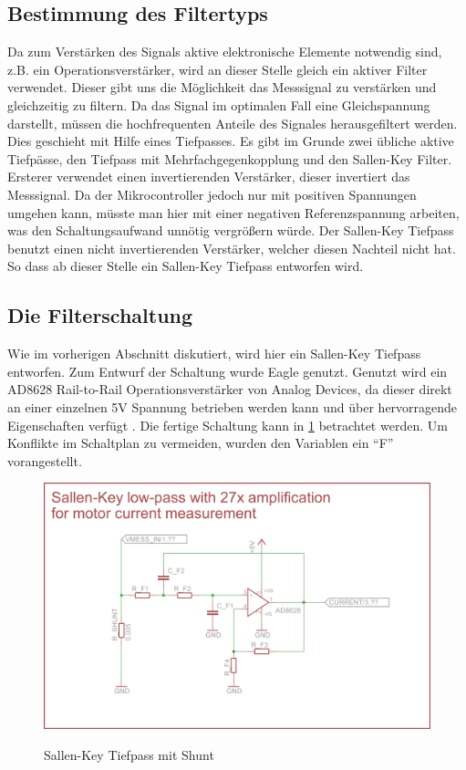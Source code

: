 \subsection{Bestimmung des Filtertyps}
Da zum Verstärken des Signals aktive elektronische Elemente notwendig sind, z.B. ein Operationsverstärker, wird an dieser Stelle gleich ein aktiver Filter verwendet. 
Dieser gibt uns die Möglichkeit das Messsignal zu verstärken und gleichzeitig zu
filtern. Da das Signal im optimalen Fall eine Gleichspannung darstellt, müssen die hochfrequenten Anteile des Signales herausgefiltert werden. Dies geschieht 
mit Hilfe eines Tiefpasses. Es gibt im Grunde zwei übliche aktive Tiefpässe, den Tiefpass mit Mehrfachgegenkopplung und den Sallen-Key Filter. Ersterer verwendet
einen invertierenden Verstärker, dieser invertiert das Messsignal. Da der Mikrocontroller jedoch nur mit positiven Spannungen umgehen kann, müsste man hier mit einer 
negativen Referenzspannung arbeiten, was den Schaltungsaufwand unnötig vergrößern würde. Der Sallen-Key Tiefpass benutzt einen nicht invertierenden Verstärker, welcher diesen
Nachteil nicht hat. So dass ab dieser Stelle ein Sallen-Key Tiefpass entworfen wird.

\subsection{Die Filterschaltung}

Wie im vorherigen Abschnitt diskutiert, wird hier ein Sallen-Key Tiefpass entworfen. Zum Entwurf der Schaltung wurde Eagle genutzt.
Genutzt wird ein AD8628  Rail-to-Rail Operationsverstärker von Analog Devices, da dieser direkt an einer einzelnen 5V Spannung betrieben werden kann und
über hervorragende Eigenschaften verfügt \cite{ds-opv}. Die fertige Schaltung kann in \cref{fig:fschalt} betrachtet werden. Um Konflikte im Schaltplan zu vermeiden,
wurden den Variablen ein ``F'' vorangestellt.
\begin{figure}[H]
\centering
\includegraphics[width=\textwidth]{filter_schaltung.png}\\
\caption{Sallen-Key Tiefpass mit Shunt}%
\label{fig:fschalt}
\end{figure}



